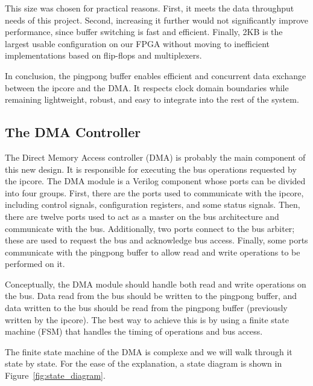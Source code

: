 \documentclass[a4paper,11pt,oneside]{report}
\begin{document}
This size was chosen for practical reasons. 
First, it meets the data throughput needs of this project. 
Second, increasing it further would not significantly improve performance, since buffer switching is fast and efficient. 
Finally, 2KB is the largest usable configuration on our FPGA without moving to inefficient implementations based on flip-flops and multiplexers.

In conclusion, the pingpong buffer enables efficient and concurrent data exchange between the ipcore and the DMA. 
It respects clock domain boundaries while remaining lightweight, robust, and easy to integrate into the rest of the system.

\subsection{The DMA Controller}

The Direct Memory Access controller (DMA) is probably the main component of this new design.  
It is responsible for executing the bus operations requested by the ipcore.  
The DMA module is a Verilog component whose ports can be divided into four groups.  
First, there are the ports used to communicate with the ipcore, including control signals, configuration registers, and some status signals.  
Then, there are twelve ports used to act as a master on the bus architecture and communicate with the bus.  
Additionally, two ports connect to the bus arbiter; these are used to request the bus and acknowledge bus access.  
Finally, some ports communicate with the pingpong buffer to allow read and write operations to be performed on it.

Conceptually, the DMA module should handle both read and write operations on the bus.  
Data read from the bus should be written to the pingpong buffer,  
and data written to the bus should be read from the pingpong buffer (previously written by the ipcore).  
The best way to achieve this is by using a finite state machine (FSM) that handles the timing of operations and bus access.

The finite state machine of the DMA is complexe and we will walk through it state by state.
For the ease of the explanation, a state diagram is shown in Figure~\ref{fig:state_diagram}.
\end{document}
